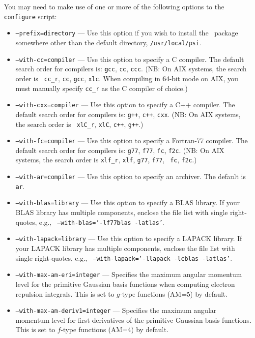 \documentclass[12pt]{article}
\begin{document}
\noindent
You may need to make use of one or more of the following options to
the {\tt configure} script:
\begin{itemize}
\item {\tt --prefix=directory} --- Use this option if you wish to
  install the \PSIthree\ package somewhere other than the default
  directory, {\tt /usr/local/psi}.
\item {\tt --with-cc=compiler} --- Use this option to specify a C
  compiler.  The default search order for compilers is: {\tt gcc},
  {\tt cc}, {\tt ccc}.  (NB: On AIX systems, the search order is {\tt
  cc\_r}, {\tt cc}, {\tt gcc}, {\tt xlc}. When compiling in 64-bit
  mode on AIX, you must manually specify {\tt cc\_r} as the C compiler
  of choice.)
\item {\tt --with-cxx=compiler} --- Use this option to specify a C++
  compiler.  The default search order for compilers is: {\tt g++},
  {\tt c++}, {\tt cxx}.  (NB: On AIX systems, the search order is {\tt
  xlC\_r}, {\tt xlC}, {\tt c++}, {\tt g++}.)
\item {\tt --with-fc=compiler} --- Use this option to specify a
  Fortran-77 compiler.  The default search order for compilers is:
  {\tt g77}, {\tt f77}, {\tt fc}, {\tt f2c}.  (NB: On AIX systems, the
  search order is {\tt xlf\_r}, {\tt xlf}, {\tt g77}, {\tt f77}, {\tt
  fc}, {\tt f2c}.)
\item {\tt --with-ar=compiler} --- Use this option to specify an
  archiver.  The default is {\tt ar}.
\item {\tt --with-blas=library} --- Use this option to specify a BLAS
  library.  If your BLAS library has multiple components, enclose the
  file list with single right-quotes, e.g., {\tt
  --with-blas='-lf77blas -latlas'}.
\item {\tt --with-lapack=library} --- Use this option to specify a
  LAPACK library.  If your LAPACK library has multiple components,
  enclose the file list with single right-quotes, e.g., {\tt
  --with-lapack='-llapack -lcblas -latlas'}.
\item {\tt --with-max-am-eri=integer} --- Specifies the maximum
  angular momentum level for the primitive Gaussian basis functions
  when computing electron repulsion integrals.  This is set to
  $g$-type functions (AM=5) by default.
\item {\tt --with-max-am-deriv1=integer} --- Specifies the maximum
  angular momentum level for first derivatives of the primitive
  Gaussian basis functions.  This is set to $f$-type functions (AM=4)
  by default.

\end{itemize}
\end{document}

